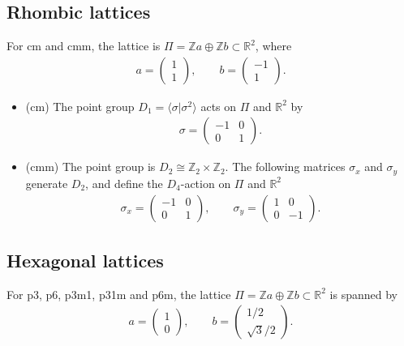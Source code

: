 \documentclass[pdftex]{sigma}
\theoremstyle{definition}
\newcommand{\R}{\mathbb{R}}
\newcommand{\Z}{\mathbb{Z}}
\begin{document}
\subsection{Rhombic lattices}

For \textsf{cm} and \textsf{cmm}, the lattice is $\Pi = \Z a \oplus \Z b \subset \R^2$, where
\begin{gather*}
a = \left(\begin{matrix} 1 \\ 1 \end{matrix} \right), \qquad b = \left(\begin{matrix} -1 \\ 1 \end{matrix} \right).
\end{gather*}
\begin{itemize}\itemsep=0pt
\item
(\textsf{cm})
The point group $D_1 = \langle \sigma | \sigma^2 \rangle$ acts on $\Pi$ and $\R^2$ by
\begin{gather*}
\sigma =
\left(
\begin{matrix}
-1 & 0 \\
0 & 1
\end{matrix}
\right).
\end{gather*}

\item
(\textsf{cmm})
The point group is $D_2 \cong \Z_2 \times \Z_2$. The following matrices $\sigma_x$ and $\sigma_y$ generate $D_2$, and def\/ine the $D_4$-action on $\Pi$ and $\R^2$
\begin{gather*}
\sigma_x = \left(\begin{matrix}
-1 & 0 \\
0 & 1
\end{matrix}\right),
\qquad
\sigma_y =\left(\begin{matrix}
1 & 0 \\
0 & -1
\end{matrix}
\right).
\end{gather*}
\end{itemize}

\subsection{Hexagonal lattices}

For \textsf{p3}, \textsf{p6}, \textsf{p3m1}, \textsf{p31m} and \textsf{p6m}, the lattice $\Pi = \Z a \oplus \Z b \subset \R^2$ is spanned by
\begin{gather*}
a = \left( \begin{matrix} 1 \\ 0 \end{matrix} \right), \qquad
b = \left( \begin{matrix} 1/2 \\ \sqrt{3}/2 \end{matrix} \right).
\end{gather*}
\end{document}
